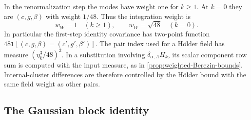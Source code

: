 In the renormalization step the modes have weight one for $k\ge1$.
At $k=0$ they are $(c,g,\beta)$ with weight $1/48$. Thus the
integration weight is
\begin{equation}\label{eq:first-step-Grassmann-weight}
 w_W=1\quad(k\ge1),\qquad w_W=\sqrt{48}\quad(k=0).
\end{equation}
In particular the first-step identity covariance has two-point
function $48\mathbf1[(c,g,\beta)=(c',g',\beta')]$.
The pair index used for a H\"older field has measure
$(\eta_k^3/48)^2$. In a substitution involving
$\delta_{\alpha,A}H_k$, its scalar component row sum is computed
with the input measure, as in
\cref{prop:weighted-Berezin-bounds}. Internal-cluster
differences are therefore controlled by the H\"older bound with the
same field weight as other pairs.

\subsection{The Gaussian block identity}\label{subsec:Gaussian-block-identity}

